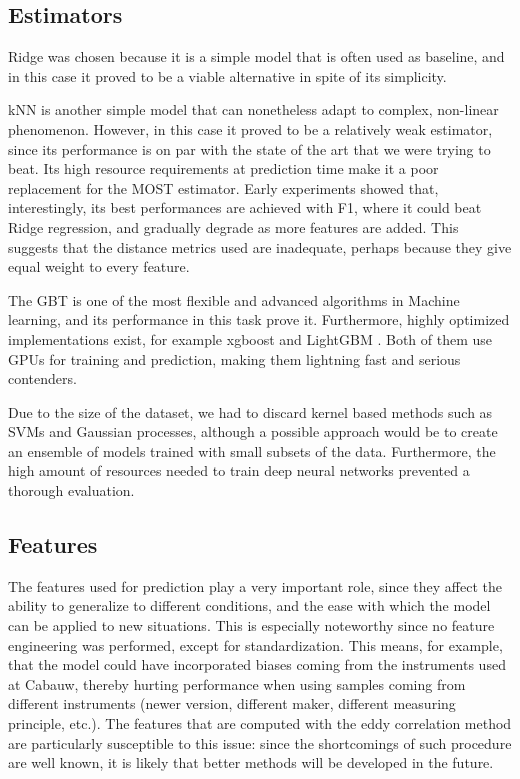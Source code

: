 \documentclass[a4paper,11pt]{kth-mag}
\begin{document}
\subsection{Estimators}
Ridge was chosen because it is a simple model that is often used as baseline, and in this case it proved to be a viable alternative in spite of its simplicity.

kNN is another simple model that can nonetheless adapt to complex, non-linear phenomenon. However, in this case it proved to be a relatively weak estimator, since its performance is on par with the state of the art that we were trying to beat. Its high resource requirements at prediction time make it a poor replacement for the MOST estimator. Early experiments showed that, interestingly, its best performances are achieved with F1, where it could beat Ridge regression, and gradually degrade as more features are added. This suggests that the distance metrics used are inadequate, perhaps because they give equal weight to every feature.

The GBT is one of the most flexible and advanced algorithms in Machine learning, and its performance in this task prove it. Furthermore, highly optimized implementations exist, for example xgboost \citep{xgboost} and LightGBM \citep{lightgbm}. Both of them use GPUs for training and prediction, making them lightning fast and serious contenders.

Due to the size of the dataset, we had to discard kernel based methods such as SVMs and Gaussian processes, although a possible approach would be to create an ensemble of models trained with small subsets of the data. Furthermore, the high amount of resources needed to train deep neural networks prevented a thorough evaluation.

\subsection{Features}
The features used for prediction play a very important role, since they affect the ability to generalize to different conditions, and the ease with which the model can be applied to new situations. This is especially noteworthy since no feature engineering was performed, except for standardization. This means, for example, that the model could have incorporated biases coming from the instruments used at Cabauw, thereby hurting performance when using samples coming from different instruments (newer version, different maker, different measuring principle, etc.). The features that are computed with the eddy correlation method are particularly susceptible to this issue: since the shortcomings of such procedure are well known, it is likely that better methods will be developed in the future.
\end{document}

